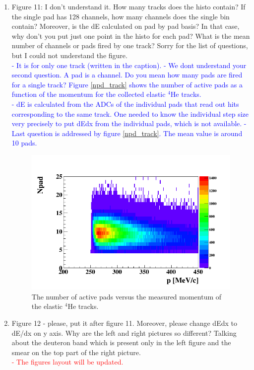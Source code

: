 \documentclass[a4paper,11pt,twoside]{article}
\begin{document}
\begin{enumerate}
\item Figure 11: I don't understand it. How many tracks does the histo contain? 
   If the single pad has 128 channels, how many channels does the single bin 
   contain? Moreover, is the dE calculated on pad by pad basis? In that case, 
   why don't you put just one point in the histo for each pad? What is the mean 
   number of channels or pads fired by one track? Sorry for the list of 
   questions, but I could not understand the figure.\\
   \textcolor{blue}{- It is for only one track (written in the caption).
   - We dont understand your second question. A pad is a channel. Do you mean 
how many pads are fired for a single track? Figure \ref{npd_track} shows the 
number of active pads as a function of the momentum for the collected elastic 
$^4$He tracks.\\
- dE is calculated from the ADCs of the individual pads that read out hits 
  corresponding to the same track. One needed to know the individual step size 
  very precisely to put dEdx from the individual pads, which is not available.  
  - Last question is addressed by figure \ref{npd_track}. The mean value is 
    around 10 pads. }

\begin{figure}[h!]
   \centering
   \includegraphics[scale=0.45]{npd_p_elastic.png}
   \caption{The number of active pads versus the measured momentum of the 
   elastic $^4$He tracks. } \label{fig:npd_track}
\end{figure}



\item Figure 12 - please, put it after figure 11. Moreover, please change dEdx 
   to dE/dx on y axis. Why are the left and right pictures so different?  
   Talking about the deuteron band which is present only in the left figure and 
   the smear on the top part of the right picture. \\
\textcolor{red}{- The figures layout will be updated.\\} 
   

\end{enumerate}
\end{document}
